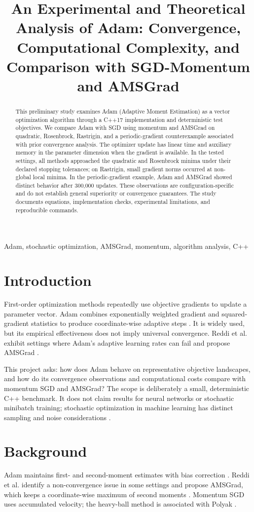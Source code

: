﻿\documentclass[conference]{IEEEtran}
\title{An Experimental and Theoretical Analysis of Adam: Convergence, Computational Complexity, and Comparison with SGD-Momentum and AMSGrad}
\author{\IEEEauthorblockN{Dario Pomasqui}\IEEEauthorblockA{School of Mathematical and Computational Sciences\\Yachay Tech University\\ECMC1018 Analysis of Algorithms}}
\begin{document}
\maketitle
\begin{abstract}
This preliminary study examines Adam (Adaptive Moment Estimation) as a vector optimization algorithm through a C++17 implementation and deterministic test objectives. We compare Adam with SGD using momentum and AMSGrad on quadratic, Rosenbrock, Rastrigin, and a periodic-gradient counterexample associated with prior convergence analysis. The optimizer update has linear time and auxiliary memory in the parameter dimension when the gradient is available. In the tested settings, all methods approached the quadratic and Rosenbrock minima under their declared stopping tolerances; on Rastrigin, small gradient norms occurred at non-global local minima. In the periodic-gradient example, Adam and AMSGrad showed distinct behavior after 300,000 updates. These observations are configuration-specific and do not establish general superiority or convergence guarantees. The study documents equations, implementation checks, experimental limitations, and reproducible commands.
\end{abstract}
\begin{IEEEkeywords}
Adam, stochastic optimization, AMSGrad, momentum, algorithm analysis, C++
\end{IEEEkeywords}
\section{Introduction}
First-order optimization methods repeatedly use objective gradients to update a parameter vector. Adam combines exponentially weighted gradient and squared-gradient statistics to produce coordinate-wise adaptive steps \cite{kingma}. It is widely used, but its empirical effectiveness does not imply universal convergence. Reddi et al. exhibit settings where Adam's adaptive learning rates can fail and propose AMSGrad \cite{reddi}.

This project asks: how does Adam behave on representative objective landscapes, and how do its convergence observations and computational costs compare with momentum SGD and AMSGrad? The scope is deliberately a small, deterministic C++ benchmark. It does not claim results for neural networks or stochastic minibatch training; stochastic optimization in machine learning has distinct sampling and noise considerations \cite{bottou}.
\section{Background}
Adam maintains first- and second-moment estimates with bias correction \cite{kingma}. Reddi et al. identify a non-convergence issue in some settings and propose AMSGrad, which keeps a coordinate-wise maximum of second moments \cite{reddi}. Momentum SGD uses accumulated velocity; the heavy-ball method is associated with Polyak \cite{polyak}.
\end{document}
